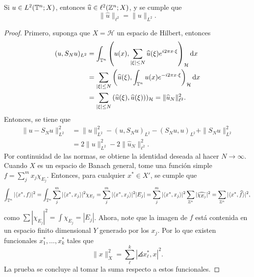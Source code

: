 \begin{theorem}
	Si $u\in L^2(\mathbb{T}^n;X)$, entonces $\widehat{u}\in\ell^2(\mathbb{Z}^n;X)$, y se cumple que 
	\begin{equation*}
		\|\widehat{u}\|_{\ell^2} = \|u\|_{L^2}.
	\end{equation*}
\end{theorem}
\begin{proof}
	Primero, suponga que $X=\mathcal{H}$ un espacio de Hilbert, entonces
	\begin{align*}
		(u, S_Nu)_{L^2} &= \int_{\mathbb{T}^n} \left(u(x), \sum_{|\xi|\leq N}\widehat{u}(\xi)e^{i2\pi x\cdot\xi}\right)_\mathcal{H}\mathop{}\!\mathrm{d} x \\
		& = \sum_{|\xi|\leq N} \left(\widehat{u}(\xi) ,\int_{\mathbb{T}^n} u(x)e^{-i2\pi x\cdot\xi} \right)_\mathcal{H}\mathop{}\!\mathrm{d} x \\
		& = \sum_{|\xi|\leq N} \left(\widehat{u}(\xi), \widehat{u}(\xi)\right))_\mathcal{H} = \|\widehat{u}_N\|_{\ell^2}^2.
	\end{align*}
	Entonces, se tiene que 
	\begin{align*}
		\|u-S_Nu\|_{L^2}^2 & = \|u\|_{L^2}^2 - (u, S_Nu)_{L^2} - (S_Nu, u)_{L^2} + \|S_Nu\|_{L^2}^2 \\
		& = 2\|u\|_{L^2}^2 - 2\|\widehat{u}_N\|_{\ell^2}^2.
	\end{align*}
	Por continuidad de las normas, se obtiene la identidad deseada al hacer $N\to\infty$. Cuando $X$ es un espacio de Banach general, tome una función simple $f=\sum_j^m x_j\chi_{E_j}$. Entonces, para cualquier $x^*\in X'$, se cumple que 
	\begin{equation*}
		\int_{\mathbb{T}^n} |\langle x^*, f\rangle|^2= \int_{\mathbb{T}^n} \sum_j^m |\langle x^*, x_j\rangle|^2\chi_{E_j}  = \sum_j^m |\langle x^*, x_j\rangle|^2|E_j| = \sum_j^m  |\langle x^*, x_j\rangle|^2 \sum_{\mathbb{Z}^n} |\widehat{\chi_{E_j}}|^2  = \sum_{\mathbb{Z}^n} |\langle x^*, \widehat{f}\rangle|^2,
	\end{equation*}
	como  $\sum |\widehat{\chi_{E_j}}|^2 = \int \chi_{E_j }= |E_j|$. Ahora, note que la imagen de $f$ está contenida en un espacio finito dimensional $Y$ generado por los $x_j$. Por lo que existen funcionales $x^*_1, \ldots,x^*_k$ tales que 
	\begin{equation*}
		\|x\|_X^2 = \sum_\ell^k |\angles{x^*_\ell, x}|^2.
	\end{equation*}
	La prueba se concluye al tomar la suma respecto a estos funcionales.
\end{proof}

